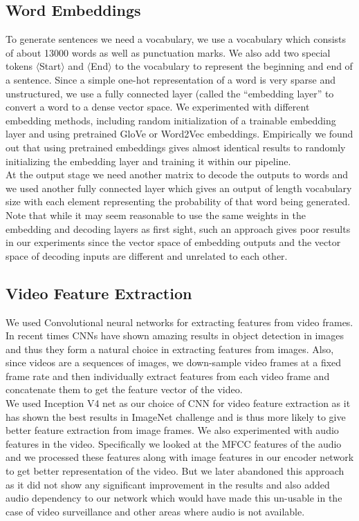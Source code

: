 \documentclass[12pt]{article}
\begin{document}
				
\subsection{Word Embeddings}
To generate sentences we need a vocabulary, we use a vocabulary which consists of about 13000 words as well as punctuation marks. We also add two special tokens $\langle$Start$\rangle$ and $\langle$End$\rangle$ to the vocabulary to represent the beginning and end of a sentence. Since a simple one-hot representation of a word is very sparse and unstructured, we use a fully connected layer (called the ``embedding layer'' to convert a word to a dense vector space. We experimented with different embedding methods, including random initialization of a trainable embedding layer and using pretrained GloVe or Word2Vec embeddings. Empirically we found out that using pretrained embeddings gives almost identical results to randomly initializing the embedding layer and training it within our pipeline.\\
At the output stage we need another matrix to decode the outputs to words and we used another fully connected layer which gives an output of length vocabulary size with each element representing the probability of that word being generated. Note that while it may seem reasonable to use the same weights in the embedding and decoding layers as first sight, such an approach gives poor results in our experiments since the vector space of embedding outputs and the vector space of decoding inputs are different and unrelated to each other.

\subsection{Video Feature Extraction}

	We used Convolutional neural networks for extracting features from video frames. In recent times CNNs have shown amazing results in object
	detection in images and thus they form a natural choice in extracting features from images. Also, since videos are a sequences of images, we
	down-sample video frames at a fixed frame rate and then individually extract features from each video frame and concatenate them to get 
	the feature vector of the video.\\
	We used Inception V4 net as our choice of CNN for video feature extraction as it has shown the best results in ImageNet challenge and is thus
	more likely to give better feature extraction from image frames. We also experimented with audio features in the video. Specifically we looked
	at the MFCC features of the audio and we processed these features along with image features in our encoder network to get better representation
	of the video. But we later abandoned this approach as it did not show any significant improvement in the results and also added audio dependency
	to our network which would have made this un-usable in the case of video surveillance and other areas where audio is not available.
	
\end{document}

